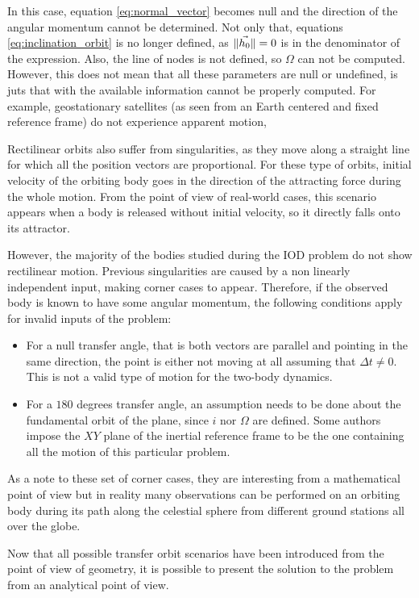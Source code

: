 In this case, equation \ref{eq:normal_vector} becomes null and the direction of
the angular momentum cannot be determined. Not only that, equations
\ref{eq:inclination_orbit} is no longer defined, as $\lVert\vec{h_{0}}\rVert=0$ is in
the denominator of the expression. Also, the line of nodes is not defined, so
$\Omega$ can not be computed. However, this does not mean that all these
parameters are null or undefined, is juts that with the available information
cannot be properly computed. For example, geostationary satellites (as seen from
an Earth centered and fixed reference frame) do not experience apparent motion,


Rectilinear orbits also suffer from singularities, as they move along a straight
line for which all the position vectors are proportional. For these type of
orbits, initial velocity of the orbiting body goes in the direction of the
attracting force during the whole motion. From the point of view of real-world
cases, this scenario appears when a body is released without initial velocity,
so it directly falls onto its attractor.

However, the majority of the bodies studied during the IOD problem do not show
rectilinear motion. Previous singularities are caused by a non linearly
independent input, making corner cases to appear. Therefore, if the observed
body is known to have some angular momentum, the following conditions apply for
invalid inputs of the problem:

\begin{itemize}
  \item For a null transfer angle, that is both vectors are parallel and pointing
        in the same direction, the point is either not moving at all assuming that
        $\Delta t \neq 0$. This is not a valid type of motion for the two-body
        dynamics.
  \item For a $180$ degrees transfer angle, an assumption needs to be done about
        the fundamental orbit of the plane, since $i$ nor $\Omega$ are defined.
        Some authors impose the $XY$ plane of the inertial reference frame to be
        the one containing all the motion of this particular problem.
\end{itemize}

As a note to these set of corner cases, they are interesting from a mathematical
point of view but in reality many observations can be performed on an orbiting
body during its path along the celestial sphere from different ground stations
all over the globe.

Now that all possible transfer orbit scenarios have been introduced from the
point of view of geometry, it is possible to present the solution to the problem
from an analytical point of view.

